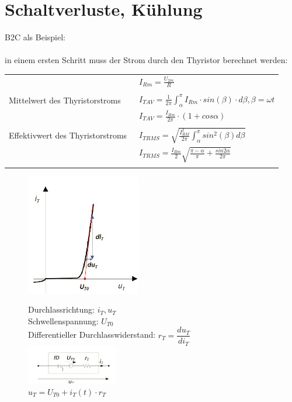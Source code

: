 \section{Schaltverluste, Kühlung}
B2C als Beispiel:\\\\
in einem ersten Schritt muss der Strom durch den Thyristor berechnet werden:\\
\begin{tabular}{ll}
  &\ $I_{Rm} = \frac{U_{2m}}{R}$\\\\
  Mittelwert des Thyristorstroms &\ $I_{T AV} = \frac{1}{2\pi}\int_{\alpha}^{\pi}I_{Rm} \cdot sin(\beta) \cdot d\beta, \beta = \omega t$\\
  &\ $I_{T AV} = \frac{I_{Rm}}{2\pi} \cdot (1+cos\alpha)$\\\\
  Effektivwert des Thyristorstroms &\ $I_{T RMS} = \sqrt{\frac{I_{RM}^2}{2\pi}\int_{\alpha}^{\pi}sin^2(\beta)d\beta}$\\
  &\ $I_{T RMS} = \frac{I_{Rm}}{2}\sqrt{\frac{\pi - \alpha}{\pi}+\frac{sin2\alpha}{2\pi}}$\\\\
\end{tabular}

\begin{figure}[htbp]
  \begin{minipage}[t]{6cm}
    \vspace{0pt}
    \centering
    \includegraphics[width = 5cm]{./pictures/kennlinieThyristor} 
  \end{minipage}
  \hfill
  \begin{minipage}[t]{6cm}
    \vspace{0pt}
    Durchlassrichtung: $i_{T}, u_{T}$\\
    Schwellenspannung: $U_{T0}$\\
    Differentieller Durchlasswiderstand: $r_{T} = \dfrac{du_{T}}{di_{T}}$\\
    \includegraphics[width = 4cm]{./pictures/schemaThyristor}\\
    $u_{T} = U_{T0}+i_{T}(t) \cdot r_{T}$
  \end{minipage}
\end{figure}

